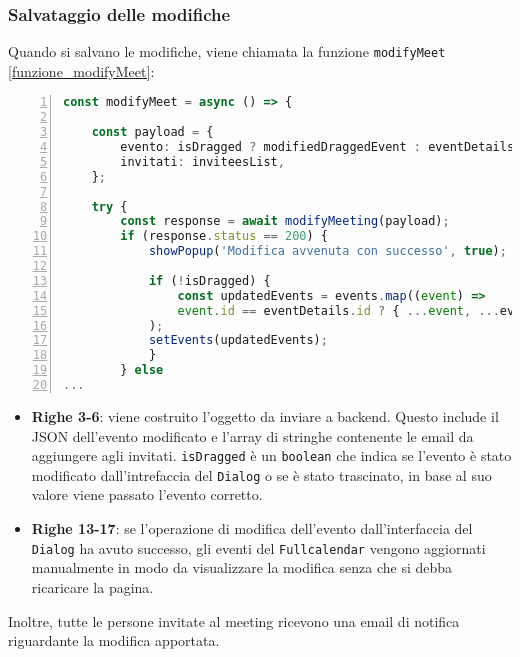 \subsubsection{Salvataggio delle modifiche}
Quando si salvano le modifiche, viene chiamata la funzione \texttt{modifyMeet} \ref{funzione_modifyMeet}:
\begin{lstlisting}[language=typescript, frame=lines, basicstyle=\ttfamily\scriptsize, numbers=left, 
    label={funzione_modifyMeet}, caption={funzione modifyMeet}]
const modifyMeet = async () => {

    const payload = {
        evento: isDragged ? modifiedDraggedEvent : eventDetails,
        invitati: inviteesList,
    };

    try {
        const response = await modifyMeeting(payload);
        if (response.status == 200) {
            showPopup('Modifica avvenuta con successo', true);
            
            if (!isDragged) {
                const updatedEvents = events.map((event) =>
                event.id == eventDetails.id ? { ...event, ...eventDetails } : event
            );
            setEvents(updatedEvents);
            }
        } else
...
\end{lstlisting}
\begin{itemize}
    \item \textbf{Righe 3-6}: viene costruito l'oggetto da inviare a backend. Questo include il JSON dell'evento modificato e l'array
    di stringhe contenente le email da aggiungere agli invitati. \texttt{isDragged} è un \texttt{boolean} che indica se l'evento
    è stato modificato dall'intrefaccia del \texttt{Dialog} o se è stato trascinato, in base al suo valore viene passato 
    l'evento corretto.
    
    \item \textbf{Righe 13-17}: se l'operazione di modifica dell'evento dall'interfaccia del \texttt{Dialog} ha
    avuto successo, gli eventi del \texttt{Fullcalendar} vengono aggiornati manualmente in modo da visualizzare la modifica senza che 
    si debba ricaricare la pagina.
\end{itemize}
Inoltre, tutte le persone invitate al meeting ricevono una email di notifica riguardante la modifica apportata.